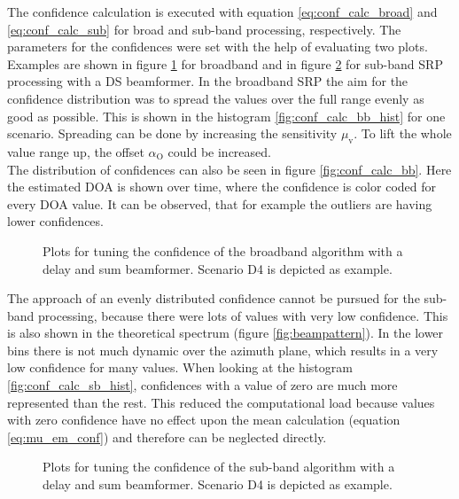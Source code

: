 The confidence calculation is executed with equation \ref{eq:conf_calc_broad} and \ref{eq:conf_calc_sub} for broad and sub-band processing, respectively. The parameters for the confidences were set with the help of evaluating two plots. Examples are  shown in figure \ref{fig:conf_bb} for broadband and in figure \ref{fig:conf_sb} for sub-band \ac{SRP} processing with a \ac{DS} beamformer. In the broadband SRP the aim for the confidence distribution was to spread the values over the full range evenly as good as possible. This is shown in the histogram \ref{fig:conf_calc_bb_hist} for one scenario. Spreading can be done by increasing the sensitivity $\mu_\text{v}$. To lift the whole value range up, the offset $\alpha_\text{O}$ could be increased. \\
The distribution of confidences can also be seen in figure \ref{fig:conf_calc_bb}. Here the estimated \ac{DOA} is shown over time, where the confidence is color coded for every \ac{DOA} value. It can be observed, that for example the outliers are having lower confidences.\\
\begin{figure}[!ht]
	\hfill
	\caption{Plots for tuning the confidence of the broadband algorithm with a delay and sum beamformer. Scenario D4 is depicted as example.}
	\label{fig:conf_bb}
\end{figure}
The approach of an evenly distributed confidence cannot be pursued for the sub-band processing, because there were lots of values with very low confidence. This is also shown in the theoretical spectrum (figure \ref{fig:beampattern}). In the lower bins there is not much dynamic over the azimuth plane, which results in a very low confidence for many values. When looking at the histogram \ref{fig:conf_calc_sb_hist}, confidences with a value of zero are much more represented than the rest. This reduced the computational load because values with zero confidence have no effect upon the mean calculation (equation \ref{eq:mu_em_conf}) and therefore can be neglected directly.
\begin{figure}[!ht]
	\hfill
	\caption{Plots for tuning the confidence of the sub-band algorithm with a delay and sum beamformer. Scenario D4 is depicted as example.}
	\label{fig:conf_sb}
\end{figure}
